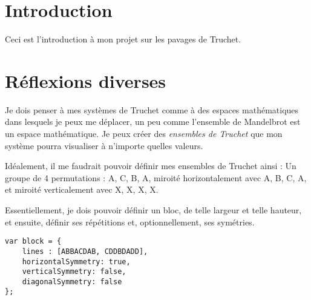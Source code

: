 
\section{Introduction}
Ceci est l'introduction à mon projet sur les pavages de Truchet.

\section{Réflexions diverses}

Je dois penser à mes systèmes de Truchet comme à des espaces mathématiques dans lesquels je peux me déplacer, un peu comme l'ensemble de Mandelbrot est un espace mathématique. Je peux créer des \textit{ensembles de Truchet} que mon système pourra visualiser à n'importe quelles valeurs.

Idéalement, il me faudrait pouvoir définir mes ensembles de Truchet ainsi :
Un groupe de 4 permutations : A, C, B, A, miroité horizontalement avec A, B, C, A, et miroité verticalement avec X, X, X, X.

Essentiellement, je dois pouvoir définir un bloc, de telle largeur et telle hauteur, et ensuite, définir ses répétitions et, optionnellement, ses symétries.

\begin{lstlisting}
var block = {
    lines : [ABBACDAB, CDDBDADD],
    horizontalSymmetry: true,
    verticalSymmetry: false,
    diagonalSymmetry: false
};
\end{lstlisting}